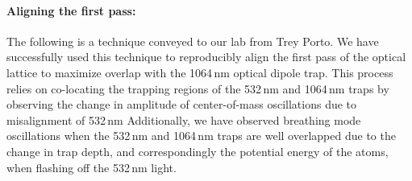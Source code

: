 \paragraph{Aligning the first pass:}
The following is a technique conveyed to our lab from Trey Porto.
We have successfully used this technique to reproducibly align the first pass of the optical lattice to maximize overlap with the 1064\,nm optical dipole trap.
This process relies on co-locating the trapping regions of the 532\,nm and 1064\,nm traps by observing the change in amplitude of center-of-mass oscillations due to misalignment of 532\,nm 
Additionally, we have observed breathing mode oscillations when the 532\,nm and 1064\,nm traps are well overlapped due to the change in trap depth, and correspondingly the potential energy of the atoms, when flashing off the 532\,nm light.

